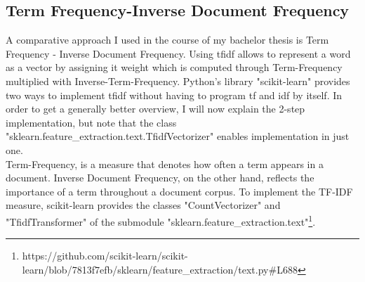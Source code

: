 \documentclass[a4paper, 11pt,titlepage,oneside,openany]{book}
\begin{document}
\subsection{Term Frequency-Inverse Document Frequency}
A comparative approach I used in the course of my bachelor thesis is Term Frequency - Inverse Document Frequency. Using \gls{tfidf} allows to represent a word as a vector by assigning it weight which is computed through Term-Frequency multiplied with Inverse-Term-Frequency.
\newpage
Python's library "scikit-learn" \cite{scikit-learn} provides two ways to implement \gls{tfidf} without having to program \gls{tf} and \gls{idf} by itself.
In order to get a generally better overview, I will now explain the 2-step implementation, but note that the class "sklearn.feature\_extraction.text.TfidfVectorizer" enables implementation in just one. \\
\indent Term-Frequency, is a measure that denotes how often a term appears in a document. Inverse Document Frequency, on the other hand, reflects the importance of a term throughout a document corpus. To implement the TF-IDF measure, scikit-learn provides the classes "CountVectorizer" and "TfidfTransformer" of the submodule "sklearn.feature\_extraction.text"\footnote{https://github.com/scikit-learn/scikit-learn/blob/7813f7efb/sklearn/feature\_extraction/text.py\#L688}.
\end{document}
